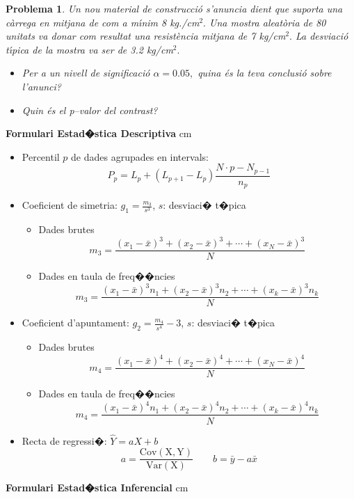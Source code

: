 \documentclass[a4paper,10pt]{article}
\newcounter{prbcont}
\newtheorem{problema}[prbcont]{Problema}
\begin{document}
\vskip 1cm
\begin{problema}
Un nou material de construcci\'o s'anuncia dient que suporta una c\`arrega en mitjana de com a m\'{\i}nim 8 kg./cm$^2.$ Una mostra aleat\`oria de 80 unitats va donar com resultat una resist\`encia mitjana de 7 kg/cm$^2.$ La desviaci\'o t\'{\i}pica de la mostra va ser de 3.2 kg/cm$^2.$
\begin{itemize}
\item [a)] Per a un nivell de significaci\'o $\alpha= 0.05,$ quina \'es la teva conclusi\'o sobre l'anunci?
\item [b)] Quin \'es el p--valor del contrast?
\end{itemize}
\end{problema}
\newpage

\textbf{Formulari Estad�stica Descriptiva}
 cm

\begin{itemize}
\item Percentil $p$ de dades agrupades en intervals:
\[
P_p=L_p + (L_{p+1}-L_p) \frac{N \cdot p - N_{p-1}}{n_p}
\]

\item Coeficient de simetria: $g_1=\frac{m_3}{s^3}$, $s$: desviaci� t�pica
\begin{itemize}
\item Dades brutes
\[
m_3=\frac{(x_1-\bar{x})^3+(x_2-\bar{x})^3+\cdots+(x_N-\bar{x})^3}{N}
\]
\item Dades en taula de freq��ncies
\[
m_3=\frac{(x_1-\bar{x})^3 n_1+(x_2-\bar{x})^3 n_2+\cdots+(x_k-\bar{x})^3 n_k}{N}
\]
\end{itemize}

\item Coeficient d'apuntament: $g_2=\frac{m_4}{s^4} - 3$, $s$: desviaci� t�pica
\begin{itemize}
\item Dades brutes
\[
m_4=\frac{(x_1-\bar{x})^4+(x_2-\bar{x})^4+\cdots+(x_N-\bar{x})^4}{N}
\]
\item Dades en taula de freq��ncies
\[
m_4=\frac{(x_1-\bar{x})^4 n_1+(x_2-\bar{x})^4 n_2+\cdots+(x_k-\bar{x})^4 n_k}{N}
\]
\end{itemize}

\item Recta de regressi�: $\hat{Y}=aX+b$
\[
a=\frac{\mathrm{Cov(X, Y)}}{\mathrm{Var(X)}} \qquad b=\bar{y}-a \bar{x}
\]

\end{itemize}

\textbf{Formulari Estad�stica Inferencial}
 cm
\end{document}
